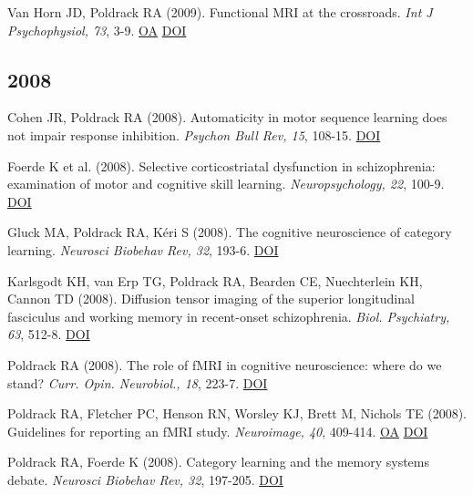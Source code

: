 Van Horn JD, Poldrack RA (2009). Functional MRI at the crossroads. \textit{Int J Psychophysiol, 73}, 3-9. \href{https://www.ncbi.nlm.nih.gov/pmc/articles/PMC2747289}{OA} \href{http://dx.doi.org/10.1016/j.ijpsycho.2008.11.003}{DOI} \vspace{2mm}

\subsection*{2008}

Cohen JR, Poldrack RA (2008). Automaticity in motor sequence learning does not impair response inhibition. \textit{Psychon Bull Rev, 15}, 108-15. \href{http://dx.doi.org/10.3758/pbr.15.1.108}{DOI} \vspace{2mm}

Foerde K et al. (2008). Selective corticostriatal dysfunction in schizophrenia: examination of motor and cognitive skill learning. \textit{Neuropsychology, 22}, 100-9. \href{http://dx.doi.org/10.1037/0894-4105.22.1.100}{DOI} \vspace{2mm}

Gluck MA, Poldrack RA, Kéri S (2008). The cognitive neuroscience of category learning. \textit{Neurosci Biobehav Rev, 32}, 193-6. \href{http://dx.doi.org/10.1016/j.neubiorev.2007.11.002}{DOI} \vspace{2mm}

Karlsgodt KH, van Erp TG, Poldrack RA, Bearden CE, Nuechterlein KH, Cannon TD (2008). Diffusion tensor imaging of the superior longitudinal fasciculus and working memory in recent-onset schizophrenia. \textit{Biol. Psychiatry, 63}, 512-8. \href{http://dx.doi.org/10.1016/j.biopsych.2007.06.017}{DOI} \vspace{2mm}

Poldrack RA (2008). The role of fMRI in cognitive neuroscience: where do we stand? \textit{Curr. Opin. Neurobiol., 18}, 223-7. \href{http://dx.doi.org/10.1016/j.conb.2008.07.006}{DOI} \vspace{2mm}

Poldrack RA, Fletcher PC, Henson RN, Worsley KJ, Brett M, Nichols TE (2008). Guidelines for reporting an fMRI study. \textit{Neuroimage, 40}, 409-414. \href{https://www.ncbi.nlm.nih.gov/pmc/articles/PMC2287206}{OA} \href{http://dx.doi.org/10.1016/j.neuroimage.2007.11.048}{DOI} \vspace{2mm}

Poldrack RA, Foerde K (2008). Category learning and the memory systems debate. \textit{Neurosci Biobehav Rev, 32}, 197-205. \href{http://dx.doi.org/10.1016/j.neubiorev.2007.07.007}{DOI} \vspace{2mm}


